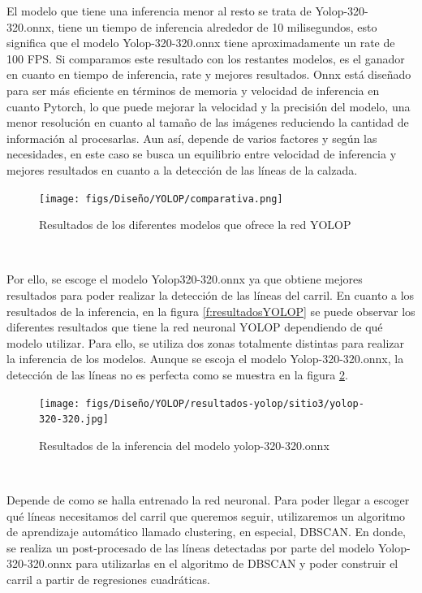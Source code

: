 El modelo que tiene una inferencia menor al resto se trata de Yolop-320-320.onnx, tiene un tiempo de inferencia alrededor de 10 milisegundos, esto
significa que el modelo Yolop-320-320.onnx tiene aproximadamente un rate de 100 FPS. Si comparamos este resultado con los restantes modelos, es el ganador en cuanto 
en tiempo de inferencia, rate y mejores resultados. 
Onnx está diseñado para ser más eficiente en términos de memoria y velocidad de inferencia en cuanto Pytorch, lo que puede mejorar la velocidad y la precisión
del modelo, una menor resolución en cuanto al tamaño de las imágenes reduciendo la cantidad de información al procesarlas. Aun así, depende de varios factores y según las necesidades, 
en este caso se busca un equilibrio entre velocidad de inferencia y mejores resultados en cuanto a la detección de las líneas de la calzada. 

\begin{figure} [H]
  \begin{center}
    \texttt{[image: figs/Diseño/YOLOP/comparativa.png]}
  \end{center}
  \caption{Resultados de los diferentes modelos que ofrece la red YOLOP}
  \label{fig:resultados_pesos_preentrenados}
\end{figure}\

Por ello, se escoge el modelo Yolop320-320.onnx ya que obtiene mejores resultados para poder realizar la detección de las líneas del carril. 
En cuanto a los resultados de la inferencia, en la figura \ref{f:resultadosYOLOP} 
se puede observar los diferentes resultados que tiene la red neuronal YOLOP dependiendo de qué modelo utilizar. Para ello, se utiliza dos zonas totalmente distintas para realizar 
la inferencia de los modelos. Aunque se escoja el modelo Yolop-320-320.onnx, la detección de las líneas no es perfecta como se muestra en la figura 
\ref{f:Inferencia320-320}.
\begin{figure} [H]
  \begin{center}
    \texttt{[image: figs/Diseño/YOLOP/resultados-yolop/sitio3/yolop-320-320.jpg]}
  \end{center}
  \caption{Resultados de la inferencia del modelo yolop-320-320.onnx}
  \label{f:Inferencia320-320}
\end{figure}\

Depende de como se halla 
entrenado la red neuronal. Para poder llegar a escoger qué líneas necesitamos del carril que queremos seguir, utilizaremos un algoritmo de aprendizaje automático llamado clustering, 
en especial, DBSCAN. En donde, se realiza un post-procesado de las líneas detectadas por parte del modelo Yolop-320-320.onnx para utilizarlas en el algoritmo de DBSCAN y poder 
construir el carril a partir de regresiones cuadráticas.



